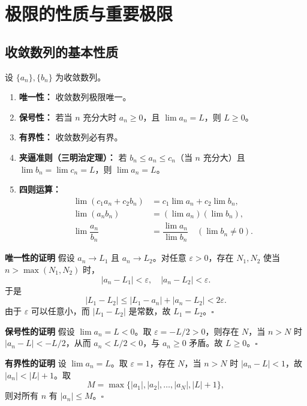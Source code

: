 \documentclass[fontset=fandol]{ctexart}
\newenvironment{custom}[1]{\par\noindent\textbf{#1}\quad}{\par\vspace{0.8em}}
\begin{document}
\clearpage
\section{极限的性质与重要极限}

\subsection{收敛数列的基本性质}

\begin{theorem}[极限的性质]
设 \(\{a_n\}, \{b_n\}\) 为收敛数列。
\begin{enumerate}
\item \textbf{唯一性：} 收敛数列极限唯一。
\item \textbf{保号性：} 若当 \(n\) 充分大时 \(a_n \geq 0\)，且 \(\lim a_n = L\)，则 \(L \geq 0\)。
\item \textbf{有界性：} 收敛数列必有界。
\item \textbf{夹逼准则（三明治定理）：} 若 \(b_n \leq a_n \leq c_n\)（当 \(n\) 充分大）且 \(\lim b_n = \lim c_n = L\)，则 \(\lim a_n = L\)。
\item \textbf{四则运算：}
   \begin{align*}
   \lim (c_1 a_n + c_2 b_n) &= c_1 \lim a_n + c_2 \lim b_n,\\
   \lim (a_n b_n) &= (\lim a_n)(\lim b_n),\\
   \lim \dfrac{a_n}{b_n} &= \dfrac{\lim a_n}{\lim b_n} \quad (\lim b_n \neq 0).
   \end{align*}
\end{enumerate}
\end{theorem}

\begin{custom}{唯一性的证明}
假设 \(a_n \to L_1\) 且 \(a_n \to L_2\)。对任意 \(\varepsilon > 0\)，存在 \(N_1, N_2\) 使当 \(n > \max(N_1, N_2)\) 时，
\[
|a_n - L_1| < \varepsilon,\quad |a_n - L_2| < \varepsilon.
\]
于是
\[
|L_1 - L_2| \leq |L_1 - a_n| + |a_n - L_2| < 2\varepsilon.
\]
由于 \(\varepsilon\) 可以任意小，而 \(|L_1 - L_2|\) 是常数，故 \(L_1 = L_2\)。\(\square\)
\end{custom}

\begin{custom}{保号性的证明}
假设 \(\lim a_n = L < 0\)。取 \(\varepsilon = -L/2 > 0\)，则存在 \(N\)，当 \(n > N\) 时 \(|a_n - L| < -L/2\)，从而 \(a_n < L/2 < 0\)，与 \(a_n \geq 0\) 矛盾。故 \(L \geq 0\)。\(\square\)
\end{custom}

\begin{custom}{有界性的证明}
设 \(\lim a_n = L\)。取 \(\varepsilon = 1\)，存在 \(N\)，当 \(n > N\) 时 \(|a_n - L| < 1\)，故 \(|a_n| < |L| + 1\)。取
\[
M = \max\{|a_1|, |a_2|, \dots, |a_N|, |L|+1\},
\]
则对所有 \(n\) 有 \(|a_n| \leq M\)。\(\square\)
\end{custom}
\end{document}
